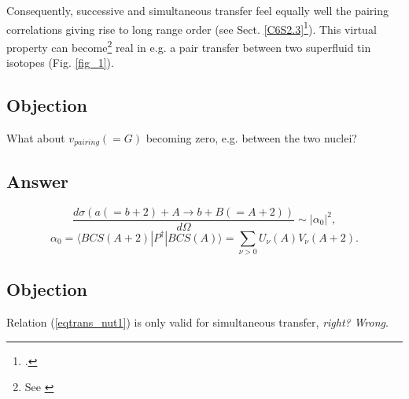 Consequently, successive and simultaneous transfer feel equally well the pairing correlations giving rise to long range order (see Sect. \ref{C6S2.3}\footnote{\cite{Potel:17}.}). This virtual property can become\footnote{See \cite{Oertzen:13}} real in e.g. a pair transfer between two superfluid tin isotopes (Fig. \ref{fig_1}).
\subsection*{Objection}
What about $v_{pairing}(=G)$ becoming zero, e.g. between the two nuclei?
\subsection*{Answer}
\begin{equation}
\frac{d\sigma(a(=b+2)+A\rightarrow b+B(=A+2))}{d\Omega}\sim |\alpha_0|^2,
\end{equation}
\begin{equation}\label{eqtrans_nut1}
\alpha_0=\langle BCS(A+2) |P^\dagger|BCS(A)\rangle=\sum_{\nu>0}U_{\nu}(A)V_{\nu}(A+2).
\end{equation}
\subsection*{Objection}
Relation (\ref{eqtrans_nut1}) is only valid for simultaneous transfer, \textit{right?} \textit{Wrong}.
